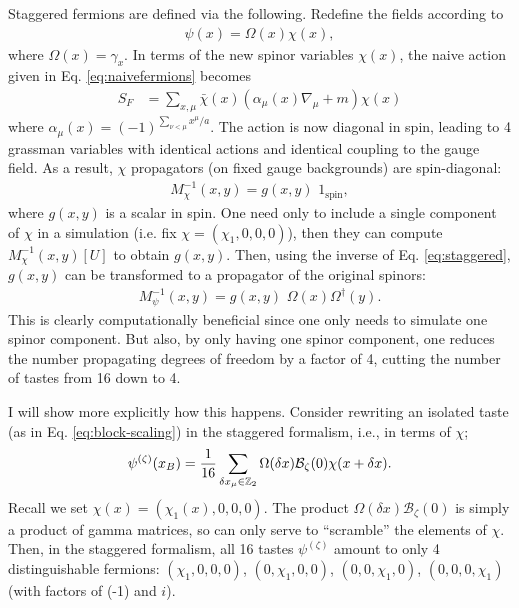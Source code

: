     Staggered fermions are defined via the following. Redefine the fields according to
    \begin{align}
      \psi(x) = \Omega(x) \chi(x),
      \label{eq:staggered}
    \end{align}
    where $\Omega(x)=\gamma_x$. In terms of the new spinor variables $\chi(x)$, the naive action given in Eq. \eqref{eq:naivefermions} becomes
    \begin{align}
      S_F &= \sum_{x,\mu} \bar{\chi}(x)(\alpha_{\mu}(x) \nabla_{\mu} + m ) \chi(x)
    \end{align}
    where $\alpha_{\mu}(x) = (-1)^{\sum_{\nu < \mu} x^{\mu}/a}$. The action is now diagonal in spin, leading to 4 grassman variables with identical actions and identical coupling to the gauge field. As a result, $\chi$ propagators (on fixed gauge backgrounds) are spin-diagonal:
    \begin{align}
      M^{-1}_{\chi}(x,y) = g(x,y) \,\, 1_{\text{spin}},
    \end{align}
    where $g(x,y)$ is a scalar in spin. One need only to include a single component of $\chi$ in a simulation (i.e. fix $\chi = (\chi_1,0,0,0)$), then they can compute $M^{-1}_{\chi}(x,y)[U]$ to obtain $g(x,y)$. Then, using the inverse of Eq. \eqref{eq:staggered}, $g(x,y)$ can be transformed to a propagator of the original spinors:
    \begin{align}
      M_{\psi}^{-1}(x,y) = g(x,y) \,\,\Omega(x)\Omega^{\dagger}(y).
    \end{align}
    This is clearly computationally beneficial since one only needs to simulate one spinor component. But also, by only having one spinor component, one reduces the number propagating degrees of freedom by a factor of 4, cutting the number of tastes from 16 down to 4.

    I will show more explicitly how this happens. Consider rewriting an isolated taste (as in Eq. \eqref{eq:block-scaling}) in the staggered formalism, i.e., in terms of $\chi$;
    \begin{align}
      \psi^{(\zeta)}(x_B) = {1\over 16} \sum_{\delta x_{\mu} \in \mathbb{Z}_2} \Omega(\delta x) \mathcal{B}_{\zeta}(0) \chi(x+\delta x).
    \label{eq:chi_blockscale}
    \end{align}
    Recall we set $\chi(x) = (\chi_1(x),0,0,0)$. The product $\Omega(\delta x)\mathcal{B}_{\zeta}(0)$ is simply a product of gamma matrices, so can only serve to ``scramble'' the elements of $\chi$. Then, in the staggered formalism, all 16 tastes $\psi^{(\zeta)}$ amount to only 4 distinguishable fermions: $(\chi_1,0,0,0)$, $(0,\chi_1,0,0)$, $(0,0,\chi_1,0)$, $(0,0,0,\chi_1)$ (with factors of (-1) and $i$).

